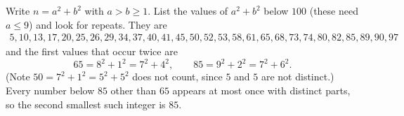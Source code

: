 Write $n=a^2+b^2$ with $a>b\ge1$. List the values of $a^2+b^2$ below $100$ (these need $a\le9$) and look for repeats. They are
\[
\begin{array}{l}
5,10,13,17,20,25,26,29,34,37,40,41,45,50,52,53,58,61,65,68,73,74,80,82,85,89,90,97
\end{array}
\]
and the first values that occur twice are
\[
65=8^2+1^2=7^2+4^2,\qquad 85=9^2+2^2=7^2+6^2 .
\]
(Note $50=7^2+1^2=5^2+5^2$ does not count, since $5$ and $5$ are not distinct.) Every number below $85$ other than $65$ appears at most once with distinct parts, so the second smallest such integer is $\boxed{85}$.

